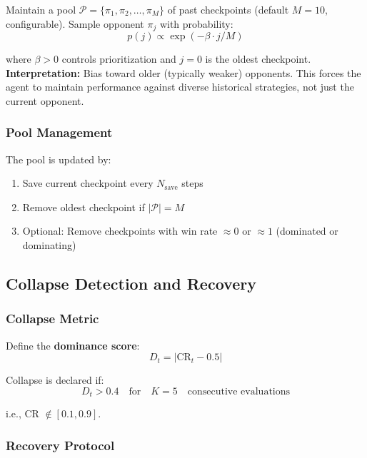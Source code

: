 \documentclass[11pt,a4paper]{report}
\begin{document}
Maintain a pool $\mathcal{P} = \{\pi_1, \pi_2, \ldots, \pi_M\}$ of past checkpoints (default $M = 10$, configurable). Sample opponent $\pi_j$ with probability:
\begin{equation}
    p(j) \propto \exp(-\beta \cdot j / M)
\end{equation}

where $\beta > 0$ controls prioritization and $j=0$ is the oldest checkpoint. \textbf{Interpretation:} Bias toward older (typically weaker) opponents. This forces the agent to maintain performance against diverse historical strategies, not just the current opponent.

\subsubsection{Pool Management}

The pool is updated by:
\begin{enumerate}
    \item Save current checkpoint every $N_{\text{save}}$ steps
    \item Remove oldest checkpoint if $|\mathcal{P}| = M$
    \item Optional: Remove checkpoints with win rate $\approx 0$ or $\approx 1$ (dominated or dominating)
\end{enumerate}

\subsection{Collapse Detection and Recovery}

\subsubsection{Collapse Metric}

Define the \textbf{dominance score}:
\begin{equation}
    D_t = |\text{CR}_t - 0.5|
\end{equation}

Collapse is declared if:
\begin{equation}
    D_t > 0.4 \quad \text{for} \quad K = 5 \quad \text{consecutive evaluations}
\end{equation}

i.e., CR $\notin [0.1, 0.9]$.

\subsubsection{Recovery Protocol}
\end{document}
